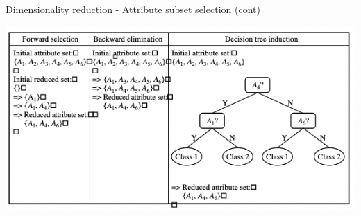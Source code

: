 \begin{frame}{Dimensionality reduction - Attribute subset selection (cont)}
    \begin{center}
        \includegraphics[width=1.0\textwidth]{assets/attr_subset_selection.png}
    \end{center}
\end{frame}

